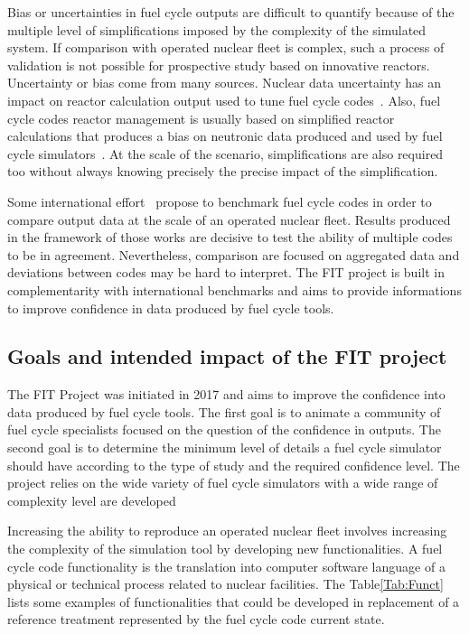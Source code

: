 Bias or uncertainties in fuel cycle outputs are difficult to quantify because of the multiple level of simplifications imposed by the complexity of the simulated system. If comparison with operated nuclear fleet is complex, such a process of validation is not possible for prospective study based on innovative reactors. Uncertainty or bias come from many sources. Nuclear data uncertainty has an impact on reactor calculation output used to tune fuel cycle codes~\cite{Krivtchik_2014}. Also, fuel cycle codes reactor management is usually based on simplified reactor calculations that produces a bias on neutronic data produced and used by fuel cycle simulators~\cite{Somaini_2017}. At the scale of the scenario, simplifications are also required too without always knowing precisely the precise impact of the simplification. 

Some international effort~\cite{NEA2016} propose to benchmark fuel cycle codes in order to compare output data at the scale of an operated nuclear fleet. Results produced in the framework of those works are decisive to test the ability of multiple codes to be in agreement. Nevertheless, comparison are focused on aggregated data and deviations between codes may be hard to interpret. The FIT project is built in complementarity with international benchmarks and aims to provide informations to improve confidence in data produced by fuel cycle tools.

\subsection{Goals and intended impact of the FIT project}

The FIT Project was initiated in 2017 and aims to improve the confidence into data produced by fuel cycle tools. The first goal is to animate a community of fuel cycle specialists focused on the question of the confidence in outputs. The second goal is to determine the minimum level of details a fuel cycle simulator should have according to the type of study and the required confidence level. The project relies on the wide variety of fuel cycle simulators with a wide range of complexity level are developed

Increasing the ability to reproduce an operated nuclear fleet involves increasing the complexity of the simulation tool by developing new functionalities. A fuel cycle code functionality is the translation into computer software language of a physical or technical process related to nuclear facilities. The Table\ref{Tab:Funct} lists some examples of functionalities that could be developed in replacement of a reference treatment represented by the fuel cycle code current state.

